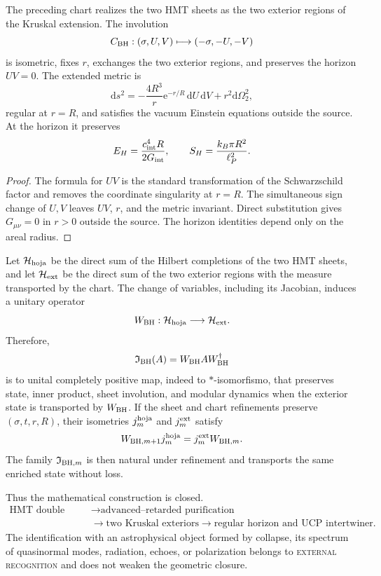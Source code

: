 \begin{theorem}
\label{thm:hmtf2-bh-doble-hoja}
The preceding chart realizes the two HMT sheets as the two exterior regions
of the Kruskal extension. The involution
\[
 C_{\rm BH}:(\sigma,U,V)\longmapsto(-\sigma,-U,-V)
\]
is isometric, fixes \(r\), exchanges the two exterior regions, and
preserves the horizon \(UV=0\). The extended metric is
\[
 \mathrm ds^2
 =-\frac{4R^3}{r}\mathrm e^{-r/R}\,\mathrm dU\,\mathrm dV
 +r^2\mathrm d\Omega_2^2,
\]
regular at \(r=R\), and satisfies the vacuum Einstein equations outside
the source. At the horizon it preserves
\[
 E_H=\frac{c_{\rm int}^4R}{2G_{\rm int}},\qquad
 S_H=\frac{k_B\pi R^2}{\ell_P^2}.
\]
\end{theorem}

\begin{proof}
The formula for \(UV\) is the standard transformation of the
Schwarzschild factor and removes the coordinate singularity at \(r=R\).
The simultaneous sign change of \(U,V\) leaves \(UV\), \(r\), and the metric
invariant. Direct substitution gives \(G_{\mu\nu}=0\) in \(r>0\) outside
the source. The horizon identities depend only on the areal radius.
\end{proof}

Let \(\mathcal H_{\rm hoja}\) be the direct sum of the Hilbert completions of the
two HMT sheets, and let \(\mathcal H_{\rm ext}\) be the direct sum of the two exterior
regions with the measure transported by the chart. The change of variables,
including its Jacobian, induces a unitary operator
\[
 W_{\rm BH}:\mathcal H_{\rm hoja}\longrightarrow\mathcal H_{\rm ext}.
\]
Therefore,
\[
 \mathfrak I_{\rm BH}(A)=W_{\rm BH}AW_{\rm BH}^{\dagger}
\]
is to unital completely positive map, indeed to
\(*\)-isomorfismo, that preserves state, inner product, sheet involution,
and modular dynamics when the exterior state is transported by \(W_{\rm BH}\).
If the sheet and chart refinements preserve
\((\sigma,t,r,R)\), their isometries \(j_m^{\rm hoja}\) and
\(j_m^{\rm ext}\) satisfy
\[
 W_{{\rm BH},m+1}j_m^{\rm hoja}
 =j_m^{\rm ext}W_{{\rm BH},m}.
\]
The family \(\mathfrak I_{{\rm BH},m}\) is then natural under
refinement and transports the same enriched state without loss.

Thus the mathematical construction is closed.
\[
\begin{aligned}
 \text{HMT double sheet}
 &\longrightarrow
 \text{advanced--retarded purification}\\
 &\longrightarrow
 \text{two Kruskal exteriors}
 \longrightarrow
 \text{regular horizon and UCP intertwiner}.
\end{aligned}
\]
The identification with an astrophysical object formed by collapse, its spectrum
of quasinormal modes, radiation, echoes, or polarization belongs to
\textsc{external recognition} and does not weaken the geometric closure.
